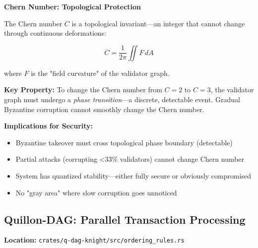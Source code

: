 \documentclass[11pt,a4paper]{article}
\begin{document}
\textbf{Chern Number: Topological Protection}

The Chern number $C$ is a topological invariant—an integer that cannot change through continuous deformations:

\[C = \frac{1}{2\pi}\iint F\,dA\]

where $F$ is the "field curvature" of the validator graph.

\textbf{Key Property:} To change the Chern number from $C=2$ to $C=3$, the validator graph must undergo a \textit{phase transition}—a discrete, detectable event. Gradual Byzantine corruption cannot smoothly change the Chern number.

\textbf{Implications for Security:}
\begin{itemize}[leftmargin=*]
\item Byzantine takeover must cross topological phase boundary (detectable)
\item Partial attacks (corrupting <33\% validators) cannot change Chern number
\item System has quantized stability—either fully secure or obviously compromised
\item No "gray area" where slow corruption goes unnoticed
\end{itemize}

\subsection{Quillon-DAG: Parallel Transaction Processing}

\textbf{Location:} \texttt{crates/q-dag-knight/src/ordering\_rules.rs}
\end{document}
